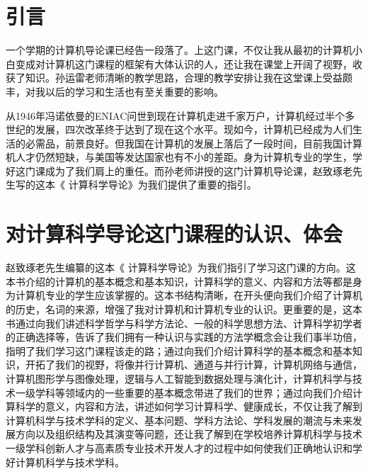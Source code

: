 \documentclass{article}
\begin{document}
\thispagestyle{empty}
\newpage
\setcounter{page}{1}

\section{引言}
一个学期的计算机导论课已经告一段落了。上这门课，不仅让我从最初的计算机小白变成对计算机这门课程的框架有大体认识的人，还让我在课堂上开阔了视野，收获了知识。孙运雷老师清晰的教学思路，合理的教学安排让我在这堂课上受益颇丰，对我以后的学习和生活也有至关重要的影响。\par
从1946年冯诺依曼的ENIAC问世到现在计算机走进千家万户，计算机经过半个多世纪的发展，四次改革终于达到了现在这个水平。现如今，计算机已经成为人们生活的必需品，前景良好。但我国在计算机的发展上落后了一段时间，目前我国计算机人才仍然短缺，与美国等发达国家也有不小的差距。身为计算机专业的学生，学好这门课成为了我们肩上的重任。而孙老师讲授的这门计算机导论课，赵致琢老先生写的这本《 计算科学导论》为我们提供了重要的指引。
\section{对计算科学导论这门课程的认识、体会}
赵致琢老先生编纂的这本《 计算科学导论》为我们指引了学习这门课的方向。这本书介绍的计算机的基本概念和基本知识，计算科学的意义、内容和方法等都是身为计算机专业的学生应该掌握的。这本书结构清晰，在开头便向我们介绍了计算机的历史，名词的来源，增强了我对计算机和计算机专业的认识。更重要的是，这本书通过向我们讲述科学哲学与科学方法论、一般的科学思想方法、计算科学初学者的正确选择等，告诉了我们拥有一种认识与实践的方法学概念会让我们事半功倍，指明了我们学习这门课程该走的路；通过向我们介绍计算科学的基本概念和基本知识，开拓了我们的视野，将像并行计算机、通道与并行计算，计算机网络与通信，计算机图形学与图像处理，逻辑与人工智能到数据处理与演化计，计算机科学与技术一级学科等领域内的一些重要的基本概念带进了我们的世界；通过向我们介绍计算科学的意义，内容和方法，讲述如何学习计算科学、健康成长，不仅让我了解到计算机科学与技术学科的定义、基本问题、学科方法论、学科发展的潮流与未来发展方向以及组织结构及其演变等问题，还让我了解到在学校培养计算机科学与技术一级学科创新人才与高素质专业技术开发人才的过程中如何使我们正确地认识和学好计算机科学与技术学科。\par
\end{document}
